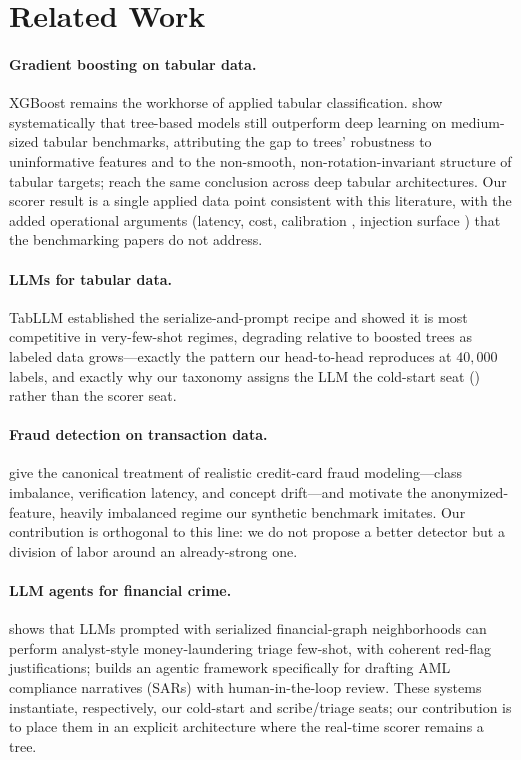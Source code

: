 \section{Related Work}
\label{sec:p8-related}

\paragraph{Gradient boosting on tabular data.} XGBoost
\citep{chen2016xgboost} remains the workhorse of applied tabular
classification. \citet{grinsztajn2022tree} show systematically that tree-based
models still outperform deep learning on medium-sized tabular benchmarks,
attributing the gap to trees' robustness to uninformative features and to the
non-smooth, non-rotation-invariant structure of tabular targets;
\citet{shwartzziv2021tabular} reach the same conclusion across deep tabular
architectures. Our scorer result is a single applied data point consistent
with this literature, with the added operational arguments (latency, cost,
calibration \citep{guo2017calibration}, injection surface
\citep{greshake2023injection}) that the benchmarking papers do not address.

\paragraph{LLMs for tabular data.} TabLLM \citep{hegselmann2023tabllm}
established the serialize-and-prompt recipe and showed it is most competitive
in very-few-shot regimes, degrading relative to boosted trees as labeled data
grows---exactly the pattern our head-to-head reproduces at $40{,}000$ labels,
and exactly why our taxonomy assigns the LLM the cold-start seat
() rather than the scorer seat.

\paragraph{Fraud detection on transaction data.} \citet{dalpozzolo2018realistic}
give the canonical treatment of realistic credit-card fraud modeling---class
imbalance, verification latency, and concept drift---and motivate the
anonymized-feature, heavily imbalanced regime our synthetic benchmark
imitates. Our contribution is orthogonal to this line: we do not propose a
better detector but a division of labor around an already-strong one.

\paragraph{LLM agents for financial crime.} \citet{pirmorad2025icl_aml} shows
that LLMs prompted with serialized financial-graph neighborhoods can perform
analyst-style money-laundering triage few-shot, with coherent red-flag
justifications; \citet{naik2025coinvestigator} builds an agentic framework
specifically for drafting AML compliance narratives (SARs) with
human-in-the-loop review. These systems instantiate, respectively, our
cold-start and scribe/triage seats; our contribution is to place them in an
explicit architecture where the real-time scorer remains a tree.

